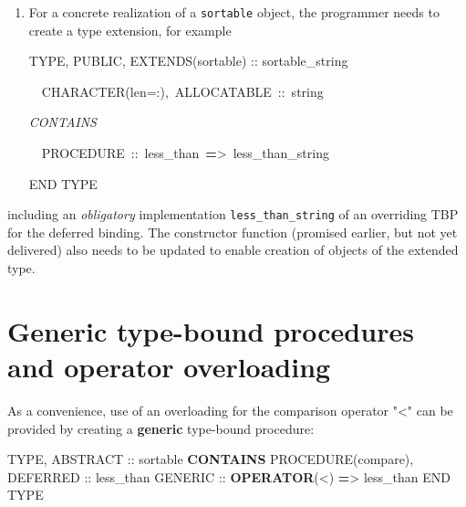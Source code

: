 \documentclass[
]{scrartcl}
\newenvironment{Shaded}{}{}
\newcommand{\CommentTok}[1]{\textcolor[rgb]{0.38,0.63,0.69}{\textit{#1}}}
\newcommand{\DataTypeTok}[1]{\textcolor[rgb]{0.56,0.13,0.00}{#1}}
\newcommand{\KeywordTok}[1]{\textcolor[rgb]{0.00,0.44,0.13}{\textbf{#1}}}
\newcommand{\NormalTok}[1]{#1}
\newcommand{\OperatorTok}[1]{\textcolor[rgb]{0.40,0.40,0.40}{#1}}
\begin{document}
\begin{enumerate}
\def\labelenumi{\arabic{enumi}.}
\item
  For a concrete realization of a \texttt{sortable} object, the
  programmer needs to create a type extension, for example

\begin{Shaded}
\begin{Highlighting}[]
\DataTypeTok{TYPE}\NormalTok{, }\DataTypeTok{PUBLIC}\NormalTok{, EXTENDS(sortable) }\DataTypeTok{::}\NormalTok{ sortable\_string}

  \DataTypeTok{CHARACTER(len=:)}\NormalTok{, ALLOCATABLE }\DataTypeTok{::}\NormalTok{ string}

\CommentTok{CONTAINS}

\NormalTok{  PROCEDURE }\DataTypeTok{::}\NormalTok{ less\_than }\KeywordTok{=}\OperatorTok{\textgreater{}}\NormalTok{ less\_than\_string}

\DataTypeTok{END TYPE}
\end{Highlighting}
\end{Shaded}
\end{enumerate}

including an \emph{obligatory} implementation
\texttt{less\_than\_string} of an overriding TBP for the deferred
binding. The constructor function (promised earlier, but not yet
delivered) also needs to be updated to enable creation of objects of the
extended type.

\section{Generic type-bound procedures and operator
overloading}\label{generic-type-bound-procedures-and-operator-overloading}

As a convenience, use of an overloading for the comparison operator
"\textless" can be provided by creating a \textbf{generic} type-bound
procedure:

\begin{Shaded}
\begin{Highlighting}[]
\DataTypeTok{TYPE}\NormalTok{, }\DataTypeTok{ABSTRACT} \DataTypeTok{::}\NormalTok{ sortable}
\KeywordTok{CONTAINS}
   \DataTypeTok{PROCEDURE(compare)}\NormalTok{, }\DataTypeTok{DEFERRED} \DataTypeTok{::}\NormalTok{ less\_than}
   \DataTypeTok{GENERIC} \DataTypeTok{::} \KeywordTok{OPERATOR}\NormalTok{(}\OperatorTok{\textless{}}\NormalTok{) }\KeywordTok{=}\OperatorTok{\textgreater{}}\NormalTok{ less\_than}
\DataTypeTok{END TYPE}
\end{Highlighting}
\end{Shaded}
\end{document}
